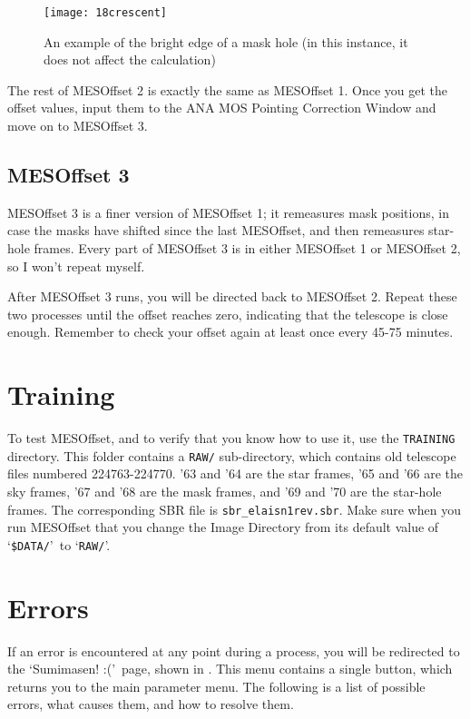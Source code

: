 \documentclass[10pt]{article}
\begin{document}
\begin{figure}
    \centering
    \texttt{[image: 18crescent]}
    \caption{An example of the bright edge of a mask hole (in this instance, it does not affect the calculation)}
    \label{fig:crescent}
\end{figure}

The rest of MESOffset 2 is exactly the same as MESOffset 1. Once you get the offset values, input them to the ANA MOS Pointing Correction Window and move on to MESOffset 3.

\subsection{MESOffset 3}

MESOffset 3 is a finer version of MESOffset 1; it remeasures mask positions, in case the masks have shifted since the last MESOffset, and then remeasures star-hole frames. Every part of MESOffset 3 is in either MESOffset 1 or MESOffset 2, so I won't repeat myself.

After MESOffset 3 runs, you will be directed back to MESOffset 2. Repeat these two processes until the offset reaches zero, indicating that the telescope is close enough. Remember to check your offset again at least once every 45-75 minutes.

\section{Training}

To test MESOffset, and to verify that you know how to use it, use the \texttt{TRAINING} directory. This folder contains a \texttt{RAW/} sub-directory, which contains old telescope files numbered 224763-224770. '63 and '64 are the star frames, '65 and '66 are the sky frames, '67 and '68 are the mask frames, and '69 and '70 are the star-hole frames. The corresponding SBR file is \texttt{sbr\_elaisn1rev.sbr}. Make sure when you run MESOffset that you change the Image Directory from its default value of \lq \texttt{\$DATA/}\rq\ to \lq \texttt{RAW/}\rq.

\section{Errors}

If an error is encountered at any point during a process, you will be redirected to the \lq Sumimasen! :(\rq\ page, shown in . This menu contains a single button, which returns you to the main parameter menu. The following is a list of possible errors, what causes them, and how to resolve them.
\end{document}
